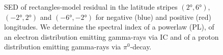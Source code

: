 \begin{figure}[h!]

  	\caption{SED of rectangles-model residual in the latitude stripes $(\ang{2}, \ang{6})$, $(\ang{-2}, \ang{2})$ and $(\ang{-6}, \ang{-2})$ for negative (blue) and positive (red) longitudes. We determine the spectral index of a powerlaw (PL), of an electron distribution emitting gamma-rays via IC and of a proton distribution emitting gamma-rays via $\pi^0$-decay.}
  	\label{fig:SED_with_fits}
\end{figure}

